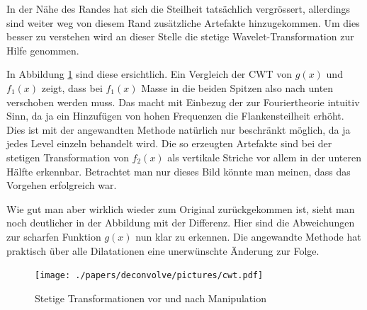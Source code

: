 In der Nähe des Randes hat sich die Steilheit tatsächlich vergrössert, allerdings sind weiter weg von diesem Rand zusätzliche Artefakte hinzugekommen.
Um dies besser zu verstehen wird an dieser Stelle die stetige Wavelet-Transformation zur Hilfe genommen.

In Abbildung \ref{deconvolve:cwt} sind diese ersichtlich.
Ein Vergleich der CWT von $g(x)$ und $f_1(x)$ zeigt, dass bei $f_1(x)$ \glqq Masse\grqq{} in die beiden Spitzen also nach unten verschoben werden muss.
Das macht mit Einbezug der zur Fouriertheorie intuitiv Sinn, da ja ein Hinzufügen von hohen Frequenzen die Flankensteilheit erhöht.
Dies ist mit der angewandten Methode natürlich nur beschränkt möglich, da ja jedes Level einzeln behandelt wird.
Die so erzeugten Artefakte sind bei der stetigen Transformation von $f_2(x)$ als vertikale Striche vor allem in der unteren Hälfte erkennbar.
Betrachtet man nur dieses Bild könnte man meinen, dass das Vorgehen erfolgreich war.

Wie gut man aber wirklich wieder zum Original zurückgekommen ist, sieht man noch deutlicher in der Abbildung mit der Differenz.
Hier sind die Abweichungen zur  scharfen Funktion $g(x)$ nun klar zu erkennen.
Die angewandte Methode hat praktisch über alle Dilatationen eine unerwünschte Änderung zur Folge.

\begin{figure}[h]
\centering
\texttt{[image: ./papers/deconvolve/pictures/cwt.pdf]}
\caption{Stetige Transformationen vor und nach Manipulation\label{deconvolve:cwt}}
\end{figure}
